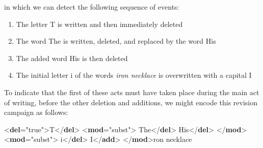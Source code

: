  in which we can detect the following sequence of events: \begin{enumerate}
\item The letter T is written and then immediately deleted
\item The word The is written, deleted, and replaced by the word His
\item The added word His is then deleted
\item The initial letter i of the words \textit{iron necklace} is overwritten with a capital I
\end{enumerate} To indicate that the first of these acts must have taken place during the main act of writing, before the other deletion and additions, we might encode this revision campaign as follows: \par\bgroup{}\exampleFont \begin{shaded}\noindent\mbox{}{<\textbf{del}\hspace*{1em}{instant}="{true}">}T{</\textbf{del}>}\mbox{}\newline 
{<\textbf{mod}\hspace*{1em}{type}="{subst}">}\mbox{}\newline 
{}The{</\textbf{del}>}\mbox{}\newline 
{}\mbox{}\newline 
\hspace*{1em}His{</\textbf{del}>}\mbox{}\newline 
{}\mbox{}\newline 
{</\textbf{mod}>}\mbox{}\newline 
{<\textbf{mod}\hspace*{1em}{type}="{subst}">}\mbox{}\newline 
{}i{</\textbf{del}>}\mbox{}\newline 
{}I{</\textbf{add}>}\mbox{}\newline 
{</\textbf{mod}>}ron necklace\mbox{}\newline 
\end{shaded}\egroup\par 
